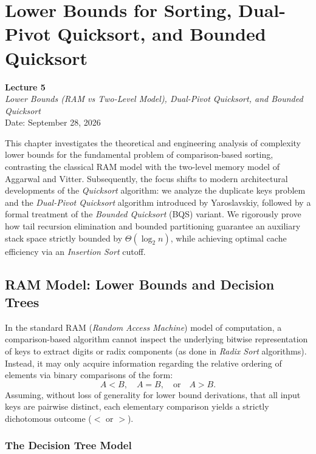 \chapter{Lower Bounds for Sorting, Dual-Pivot Quicksort, and Bounded Quicksort}
\label{cha:lecture-five}

\begin{center}
  \textbf{Lecture 5}\\
  \emph{Lower Bounds (RAM vs Two-Level Model), Dual-Pivot Quicksort, and Bounded Quicksort}\\[0.5em]
  Date: September 28, 2026
\end{center}

This chapter investigates the theoretical and engineering analysis of complexity lower bounds for the fundamental problem of comparison-based sorting, contrasting the classical RAM model with the two-level memory model of Aggarwal and Vitter. Subsequently, the focus shifts to modern architectural developments of the \textit{Quicksort} algorithm: we analyze the duplicate keys problem and the \textit{Dual-Pivot Quicksort} algorithm introduced by Yaroslavskiy, followed by a formal treatment of the \textit{Bounded Quicksort} (BQS) variant. We rigorously prove how tail recursion elimination and bounded partitioning guarantee an auxiliary stack space strictly bounded by $\Theta(\log_2 n)$, while achieving optimal cache efficiency via an \textit{Insertion Sort} cutoff.

\FloatBarrier
\section{RAM Model: Lower Bounds and Decision Trees}
\label{sec:ram-lower-bounds}

In the standard RAM (\textit{Random Access Machine}) model of computation, a comparison-based algorithm cannot inspect the underlying bitwise representation of keys to extract digits or radix components (as done in \textit{Radix Sort} algorithms). Instead, it may only acquire information regarding the relative ordering of elements via binary comparisons of the form:
\begin{equation}
  A < B, \quad A = B, \quad \text{or} \quad A > B.
\end{equation}
Assuming, without loss of generality for lower bound derivations, that all input keys are pairwise distinct, each elementary comparison yields a strictly dichotomous outcome ($<$ or $>$).

\subsection{The Decision Tree Model}
\label{subsec:decision-tree-model}

